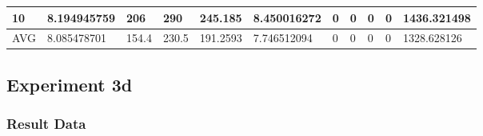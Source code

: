 \begin{table}[H]
\begin{adjustbox}{max width=380pt,keepaspectratio,angle=90}
\begin{tabular}{|l|l|l|l|l|l|l|l|l|l|l|}
					10         & 8.194945759 & 206        & 290        & 245.185    & 8.450016272 & 0           & 0           & 0           & 0           & 1436.321498 \\ \hline
					AVG        & 8.085478701 & 154.4      & 230.5      & 191.2593   & 7.746512094 & 0           & 0           & 0           & 0           & 1328.628126 \\ \hline
				\end{tabular}
			\end{adjustbox}	
		\end{table}
	
	\subsection{Experiment 3d}
	\label{sec:A_Exp3d}
		\subsubsection{Result Data}
		\label{sec:A_Exp3d_Data}
